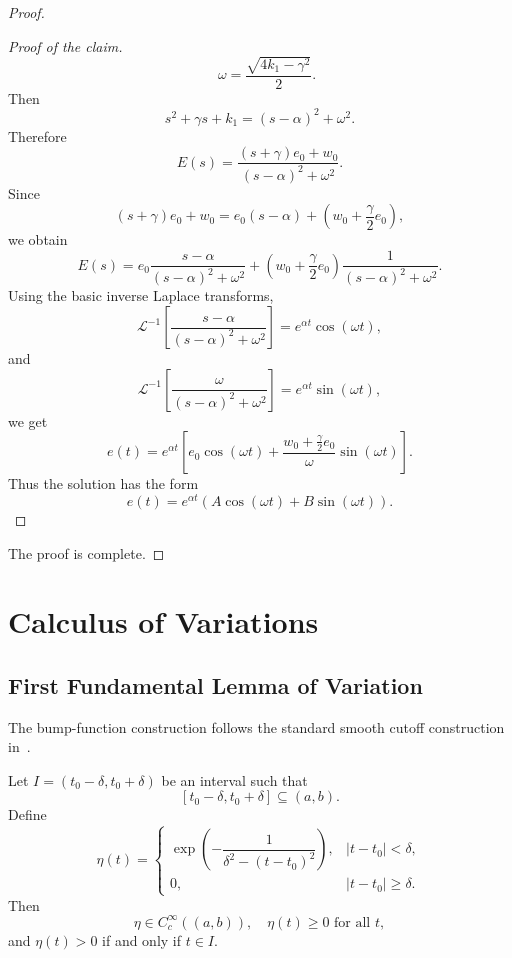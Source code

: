 ﻿\documentclass[12pt]{article}
\begin{document}
\begin{proof}
\begin{proof}[Proof of the claim]
\[ \quad
 \omega = \frac{\sqrt{4k_1 - \gamma^2}}2.
\]
Then
\[
 s^2 + \gamma s + k_1 = (s - \alpha)^2 + \omega^2.
\]
Therefore
\[
 E(s) = \frac{(s + \gamma)e_0 + w_0}{(s - \alpha)^2 + \omega^2}.
\]
Since
\[
 (s + \gamma)e_0 + w_0
 =
 e_0(s - \alpha)
 +
 \left(w_0 + \frac{\gamma}{2}e_0\right),
\]
we obtain
\[
 E(s)
 =
 e_0\frac{s - \alpha}{(s - \alpha)^2 + \omega^2}
 +
 \left(w_0 + \frac{\gamma}{2}e_0\right)
 \frac{1}{(s - \alpha)^2 + \omega^2}.
\]
Using the basic inverse Laplace transforms,
\[
 \mathcal L^{-1}\left[
 \frac{s - \alpha}{(s - \alpha)^2 + \omega^2}
 \right]
 =
 e^{\alpha t}\cos(\omega t),
\]
and
\[
 \mathcal L^{-1}\left[
 \frac{\omega}{(s - \alpha)^2 + \omega^2}
 \right]
 =
 e^{\alpha t}\sin(\omega t),
\]
we get
\[
 e(t)
 =
 e^{\alpha t}
 \left[
 e_0\cos(\omega t)
 +
 \frac{w_0 + \frac{\gamma}{2}e_0}{\omega}\sin(\omega t)
 \right].
\]
Thus the solution has the form
\[
 e(t) = e^{\alpha t}\left(A\cos(\omega t) + B\sin(\omega t)\right).
\]
\end{proof}
The proof is complete.
\end{proof}

\section{Calculus of Variations}
\subsection{First Fundamental Lemma of Variation}
The bump-function construction follows the standard smooth cutoff construction in~\cite{lee_smooth_manifolds}.
\begin{lemma}
Let $I = (t_0 - \delta, t_0 + \delta)$ be an interval such that
\[
 [t_0 - \delta, t_0 + \delta] \subseteq (a, b).
\]
Define
\[
\eta(t) =
\begin{cases}
\exp\left(-\dfrac{1}{\delta^2 - (t - t_0)^2}\right),
& |t - t_0| < \delta,\\[1em]
0,
& |t - t_0| \geq \delta.
\end{cases}
\]
Then
\[
 \eta \in C_c^\infty((a, b)),\quad \eta(t) \geq 0 \text{ for all }t,
\]
and $\eta(t) > 0$ if and only if $t \in I$.
\end{lemma}
\end{document}
